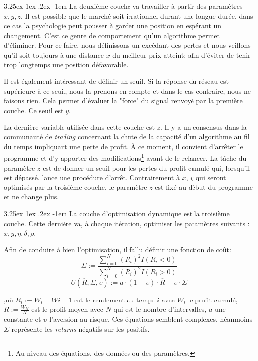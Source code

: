 \documentclass[a4paper, 11pt]{article}
\makeatletter
\renewcommand\paragraph{\@startsection{paragraph}{5}{\z@}%
  {3.25ex \@plus1ex \@minus.2ex}%
  {-1em}%
  {\normalfont\normalsize\bfseries}}
\makeatother
\begin{document}
\paragraph{}
La deuxième couche va travailler à partir des paramètres $x,y,z$. Il est possible que le marché soit irrationnel durant une longue
durée, dans ce cas la psychologie peut pousser à garder une position en espérant un changement. C'est ce genre de comportement qu'un
algorithme permet d'éliminer. Pour ce faire, nous définissons un excédant des pertes et nous veillons qu'il soit toujours à une distance
$x$ du meilleur prix atteint; afin d'éviter de tenir trop longtemps une position défavorable.

Il est également intéressant de définir un seuil. Si la réponse du réseau est supérieure à ce seuil, nous la prenons en compte et
dans le cas contraire, nous ne faisons rien. Cela permet d'évaluer la "force" du signal renvoyé par la première couche. Ce seuil
est $y$.

La dernière variable utilisée dans cette couche est $z$. Il y a un consensus dans la communauté de \textit{trading} concernant la chute de la capacité d'un algorithme au fil du temps impliquant une perte de profit. À ce moment, il convient d'arrêter le programme
et d'y apporter des modifications\footnote{Au niveau des équations, des données ou des paramètres.} avant de le relancer. La tâche du
paramètre $z$ est de donner un seuil pour les pertes du profit cumulé qui, lorsqu'il est dépassé, lance une procédure d'arrêt.
Contrairement à $x$, $y$ qui seront optimisés par la troisième couche, le paramètre $z$ est fixé au début du programme et ne change plus.

\paragraph{}
La couche d'optimisation dynamique est la troisième couche. Cette dernière va, à chaque itération, optimiser les paramètres suivants :
$x,y,\eta,\delta,\rho$.

Afin de conduire à bien l'optimisation, il fallu définir une fonction de coût\cite{fx_trading}:
$$\Sigma := \frac{\sum_{i=0}^N (R_i)^2 I(R_i < 0)}{\sum_{i=0}^N (R_i)^2 I(R_i > 0)}$$
$$ U(\overline{R},\Sigma,\upsilon) := a\cdot(1-\upsilon)\cdot \overline{R} - \upsilon \cdot \Sigma$$

,où $R_i := W_i - W{i-1}$ est le rendement au temps $i$ avec $W_i$ le profit cumulé, $\overline{R} := \frac{W_N}{N}$ est le profit moyen
avec $N$ qui est le nombre d'intervalles, $a$ une constante et $\upsilon$ l'aversion au risque.
Ces équations semblent complexes, néanmoins $\Sigma$ représente les \textit{returns} négatifs sur les positifs.
\end{document}
